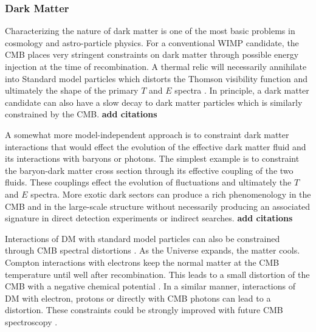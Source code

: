 \vspace{-0.15in}
\subsubsection{Dark Matter}
\vspace{-0.05in}

Characterizing the nature of dark matter is one of the most basic problems in cosmology and astro-particle physics.  For a conventional WIMP candidate, the CMB places very stringent constraints on dark matter through possible energy injection at the time of recombination.  A thermal relic will necessarily annihilate into Standard model particles which distorts the Thomson visibility function and ultimately the shape of the primary $T$ and $E$ spectra \citep{Peebles2000, Chen2004, Padmanabhan2005}.  In principle, a dark matter candidate can also have a slow decay to dark matter particles which is similarly constrained by the CMB. {\bf add citations}

A somewhat more model-independent approach is to constraint dark matter interactions that would effect the evolution of the effective dark matter fluid and its interactions with baryons or photons.  The simplest example is to constraint the baryon-dark matter cross section through its effective coupling of the two fluids.  These couplings effect the evolution of fluctuations and ultimately the $T$ and $E$ spectra.  More exotic dark sectors can produce a rich phenomenology in the CMB and in the large-scale structure without necessarily producing an associated signature in direct detection experiments or indirect searches.  {\bf add citations}

Interactions of DM with standard model particles can also be constrained through CMB spectral distortions \citep{Yacine2015DM}. As the Universe expands, the matter cools. Compton interactions with electrons keep the normal matter at the CMB temperature until well after recombination. This leads to a small distortion of the CMB with a negative chemical potential \citep{Chluba2011therm}. In a similar manner, interactions of DM with electron, protons or directly with CMB photons can lead to a distortion. These constraints could be strongly improved with future CMB spectroscopy \citep{Yacine2015DM}.


